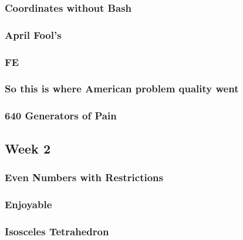 \documentclass[titlepage=true]{scrartcl}
\begin{document}
    \subsubsection{Coordinates without Bash}
	\label{12.1.3}
	
	\newpage

    \subsubsection{April Fool's}
	\label{12.1.4}
	
	\newpage
	
	\subsubsection{FE}
	\label{12.1.5}
	
	\newpage

	\subsubsection{So this is where American problem quality went}
	\label{12.1.6}
	
	\newpage

	\subsubsection{640 Generators of Pain}
	\label{12.1.7}
	
	\newpage

    \subsection{Week 2}

    \subsubsection{Even Numbers with Restrictions}
	\label{12.2.1}
	
	\newpage
    
    \subsubsection{Enjoyable}
	\label{12.2.2}
	
	\newpage

    \subsubsection{Isosceles Tetrahedron}
	\label{12.2.3}
	
	\newpage
\end{document}
